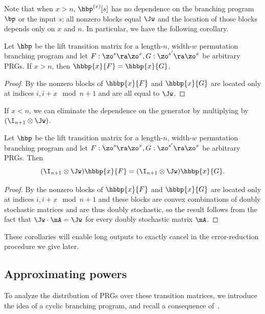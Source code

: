 \documentclass{toc}
\begin{document}
Note that when $x>n$, $\hbp^{(x)}[s]$ has no dependence on the branching program $\bp$ or the input $s$; all nonzero blocks equal $\Jw$ and the location of those blocks depends only on $x$ and $n$. In particular, we %
have the following corollary.  %
\begin{corollary}\label{cor:longPRGtriv}
Let $\hbp$ be the lift transition matrix for a length-$n$, width-$w$ permutation branching program and let $F:\zo^s\ra\zo^x,G:\zo^{s'}\ra\zo^x$ be arbitrary PRGs. If $x>n$, then $\hbbp{x}{F}=\hbbp{x}{G}$.
\end{corollary}
\begin{proof}
By  the nonzero blocks of $\hbbp{x}{F}$ and $\hbbp{x}{G}$ are located only at indices $i,i+x \mod n+1$ and are all equal to $\Jw$.
\end{proof}
If $x<n$, we can eliminate the dependence on the generator by multiplying by $(\I_{n+1}\otimes \Jw)$.
\begin{corollary}\label{cor:hbpCommutes}
Let $\hbp$ be the lift transition matrix for a length-$n$, width-$w$ permutation branching program and let $F:\zo^s\ra\zo^x,G:\zo^{s'}\ra\zo^x$ be arbitrary PRGs. Then
\[(\I_{n+1}\otimes \Jw)\hbbp{x}{F}=(\I_{n+1}\otimes \Jw)\hbbp{x}{G}.\]
\end{corollary}
\begin{proof}
By  the nonzero blocks of $\hbbp{x}{F}$ and $\hbbp{x}{G}$ are located only at indices $i,i+x \mod n+1$ and these blocks are convex combinations of doubly stochastic matrices and are thus doubly stochastic, so the result follows from the fact that $\Jw\cdot\mA=\Jw$ for every doubly stochastic matrix $\mA$.
\end{proof}
These corollaries will enable long outputs to exactly cancel in the error-reduction procedure we give later.

\subsection{Approximating powers}
To analyze the distribution of PRGs over these transition matrices, we introduce the idea of a cyclic branching program, and recall a consequence of~\cite{HozaPyVa21}.
    
\end{document}
